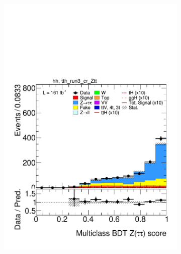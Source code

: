 \begin{figure}[htbp]
  \begin{subfigure}[b]{0.49\textwidth}
    \centering
    \includegraphics[width=\textwidth]{images/plots_modelling_run2_run3_variables/run_3_tth/plot_tth_th_multiclass_Z_hh_tth_run3_cr_Ztt_22_23_24.pdf}
    \caption{}
    \label{fig:overtrain_ttbar}
  \end{subfigure}
  \hfill
  \begin{subfigure}[b]{0.49\textwidth}
    \centering

\end{subfigure}
\end{figure}
